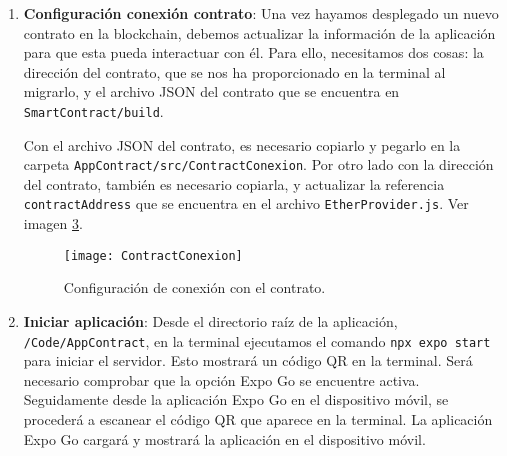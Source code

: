 \begin{enumerate}
\begin{figure}[h]
	\label{img:TruffleCompile}
	\centering
	\texttt{[image: TruffleCompile]}
	\caption[Compilar smart contract]{Compilar \textit{cmart contract} usando Truffle.}
\end{figure}	
	
	\begin{itemize}
	\item \textbf{Migrar}: Finalmente, el último paso es desplegar el contrato en la blockchain.
	Esto se realiza desde el directorio \textit{SmartContract} usando el comando \texttt{truffle migrate}.
	Este comando desplegará los contratos inteligentes en la red configurada, en este caso Ganache y generará
	los archivos necesarios en el directorio \textit{build/contracts}.
	Tras una correcta migración, se mostrará la dirección del contrato, la cuenta del creador, el costo total
	del despliegue, etcétera. 	
Ver imagen \ref{img:TruffleMigrate}.
	\end{itemize}
	
\begin{figure}[h]
	\label{img:TruffleMigrate}
	\centering
	\texttt{[image: TruffleMigrate]}
	\caption[Despliegue smart contract]{Despliegue del contrato en la red de Ganache usando Truffle.}
\end{figure}	
	
	
\item \textbf{Configuración conexión contrato}: Una vez hayamos desplegado un nuevo contrato en la blockchain, debemos actualizar la información de la aplicación para que esta pueda interactuar con él.
Para ello, necesitamos dos cosas: la dirección del contrato, que se nos ha proporcionado en la terminal al migrarlo, y el archivo JSON del contrato que se encuentra en \texttt{SmartContract/build}.
	
Con el archivo JSON del contrato, es necesario copiarlo y pegarlo en la carpeta \texttt{AppContract/src/ContractConexion}. 
Por otro lado con la dirección del contrato, también es necesario copiarla, y actualizar la referencia \texttt{contractAddress} que se encuentra en el archivo \texttt{EtherProvider.js}.
Ver imagen \ref{img:ContractConexion}.

\begin{figure}[h]
	\label{img:ContractConexion}
	\centering
	\texttt{[image: ContractConexion]}
	\caption[Conexión con el contrato]{Configuración de conexión con el contrato.}
\end{figure}	

\item \textbf{Iniciar aplicación}: Desde el directorio raíz de la aplicación, \texttt{/Code/AppContract}, en la terminal ejecutamos el comando \texttt{npx expo start} para iniciar el servidor. Esto mostrará un código QR en la terminal. Será necesario comprobar que la opción Expo Go se encuentre activa.
Seguidamente desde la aplicación Expo Go en el dispositivo móvil, se procederá a escanear el código QR que aparece en la terminal.
La aplicación Expo Go cargará y mostrará la aplicación en el dispositivo móvil.

\end{enumerate}

